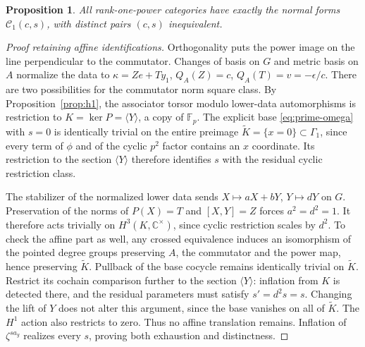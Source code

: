 \documentclass[11pt]{amsart}
\newtheorem{proposition}[theorem]{Proposition}
\theoremstyle{definition}\newtheorem{definition}[theorem]{Definition}
\newcommand{\Fp}{\mathbb F_p}
\newcommand{\C}{\mathbb C}
\newcommand{\cC}{\mathcal C}
\begin{document}
\begin{proposition}\label{prop:prime-orbits}
All rank-one-power categories have exactly the normal forms $\cC_1(c,s)$,
with distinct pairs $(c,s)$ inequivalent.
\end{proposition}
\begin{proof}[Proof retaining affine identifications]
Orthogonality puts the power image on the line perpendicular to the
commutator. Changes of basis on $G$ and metric basis on $A$ normalize the data
to $\kappa=Z e+T y_1$, $Q_A(Z)=c$, $Q_A(T)=v=-\epsilon/c$.
There are two possibilities for the commutator norm square class.
By Proposition~\ref{prop:h1}, the associator torsor modulo lower-data
automorphisms is restriction to $K=\ker P=\langle Y\rangle$, a copy of $\Fp$.
The explicit base \eqref{eq:prime-omega} with $s=0$ is identically trivial
on the entire preimage $\widetilde K=\{x=0\}\subset\Gamma_1$, since every term
of $\phi$ and of the cyclic $p^2$ factor contains an $x$ coordinate. Its
restriction to the section $\langle Y\rangle$ therefore identifies $s$ with
the residual cyclic restriction class.

The stabilizer of the normalized lower data sends
$X\mapsto aX+bY$, $Y\mapsto dY$ on $G$. Preservation of the norms of
$P(X)=T$ and $[X,Y]=Z$ forces $a^2=d^2=1$.
It therefore acts trivially on $H^3(K,\C^\times)$, since cyclic restriction
scales by $d^2$. To check the affine part as well, any crossed equivalence
induces an isomorphism of the pointed degree groups preserving $A$, the
commutator and the power map, hence preserving $\widetilde K$. Pullback of
the base cocycle remains identically trivial on $\widetilde K$. Restrict its
cochain comparison further to the section $\langle Y\rangle$: inflation from
$K$ is detected there, and the residual parameters must satisfy
$s'=d^2s=s$. Changing the lift of $Y$ does not alter this argument, since the
base vanishes on all of $\widetilde K$. The $H^1$ action also restricts to zero.
Thus no affine translation remains. Inflation of $\zeta^{s a_y}$ realizes
every $s$, proving both exhaustion and distinctness.
\end{proof}
\end{document}
